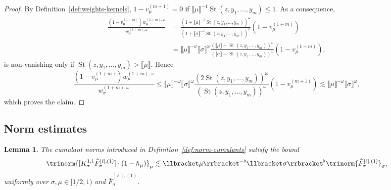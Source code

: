 \documentclass{article}
\numberwithin{equation}{section}
\theoremstyle{plain}
\newtheorem{lemma}[theorem]{Lemma}
\theoremstyle{definition}
\begin{document}
\begin{proof}
  By Definition~\ref{def:weights-kernels}, $1 - v^{(m + 1)}_{\mu} = 0$ if
  $\llbracket \mu \rrbracket^{- 1} \operatorname{St} (z, y_1, \ldots, y_m) \leqslant
  1$. As a consequence,
  \[ \begin{aligned}
       \frac{(1 - v^{(1 + m)}_{\mu}) w^{(1 + m), \omega}_{\mu}}{w^{(1 + m),
       \omega}_{\sigma}} & =  \frac{\left( 1 + \llbracket \mu \rrbracket^{-
       1} \operatorname{St}(z, y_1, \ldots, y_m) 
       \right)^{\omega}}{\left( 1 + \llbracket \sigma \rrbracket^{- 1}
       \operatorname{St}(z, y_1, \ldots, y_m)  \right)^{\omega}}
       (1 - v^{(1 + m)}_{\mu})\\
       & =  \llbracket \mu \rrbracket^{- \omega} \llbracket \sigma
       \rrbracket^{\omega} \frac{\left( \llbracket \mu \rrbracket  +
       \operatorname{St}(z, y_1, \ldots, y_m) \right)^{\omega}}{\left(
       \llbracket \sigma \rrbracket  + \operatorname{St}(z, y_1, \ldots, y_m)
       \right)^{\omega}} (1 - v^{(1 + m)}_{\mu}),
     \end{aligned} \]
  is non-vanishing only if $\operatorname{St} (z, y_1, \ldots, y_m) > \llbracket \mu
  \rrbracket$. Hence
  \[ \frac{(1 - v^{(1 + m)}_{\mu}) w^{(1 + m), \omega}_{\mu}}{w^{(1 + m),
     \omega}_{\sigma}} \leqslant \llbracket \mu \rrbracket^{- \omega}
     \llbracket \sigma \rrbracket^{\omega} \frac{\left( 2
     \operatorname{St}(z, y_1, \ldots, y_m) \right)^{\omega}}{\left(
     \operatorname{St}(z, y_1, \ldots, y_m) \right)^{\omega}} (1 - v^{(m +
     1)}_{\mu}) \lesssim \llbracket \mu \rrbracket^{- \omega} \llbracket
     \sigma \rrbracket^{\omega}, \]
  which proves the claim.
\end{proof}

\subsection{Norm estimates}

\begin{lemma}
  \label{lem:estimates-1-h}The cumulant norms introduced in
  Definition~\ref{def:norm-cumulants} satisfy the bound
  \[ \trinorm{ [K^{1, 1}_{\sigma} \dot{\bar{F}}_{\sigma}^{[\ell], (1)}]
     \cdot (1 - h_{\mu}) }_{\mu} \lesssim \llbracket \mu
     \rrbracket^{- \flat} \llbracket \sigma \rrbracket^{\flat}  \trinorm{
     \dot{\bar{F}}_{\sigma}^{[\ell], (1)} }_{\sigma}, \]
  uniformly over $\sigma, \mu \in [1 / 2, 1)$ and
  $\dot{\bar{F}}_{\sigma}^{[\ell], (1)}$.
\end{lemma}
\end{document}
